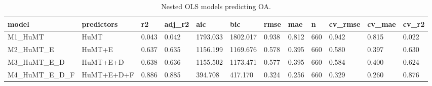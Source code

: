 \begin{table}[t]
\centering
\caption{Nested OLS models predicting OA.}
\label{tab:nested_ols}
\begin{tabular}{llllllllllll}
\toprule
model & predictors & r2 & adj\_r2 & aic & bic & rmse & mae & n & cv\_rmse & cv\_mae & cv\_r2 \\
\midrule
M1\_HuMT & HuMT & 0.043 & 0.042 & 1793.033 & 1802.017 & 0.938 & 0.812 & 660 & 0.942 & 0.815 & 0.022 \\
M2\_HuMT\_E & HuMT+E & 0.637 & 0.635 & 1156.199 & 1169.676 & 0.578 & 0.395 & 660 & 0.580 & 0.397 & 0.630 \\
M3\_HuMT\_E\_D & HuMT+E+D & 0.638 & 0.636 & 1155.502 & 1173.471 & 0.577 & 0.395 & 660 & 0.584 & 0.400 & 0.624 \\
M4\_HuMT\_E\_D\_F & HuMT+E+D+F & 0.886 & 0.885 & 394.708 & 417.170 & 0.324 & 0.256 & 660 & 0.329 & 0.260 & 0.876 \\
\bottomrule
\end{tabular}
\end{table}
